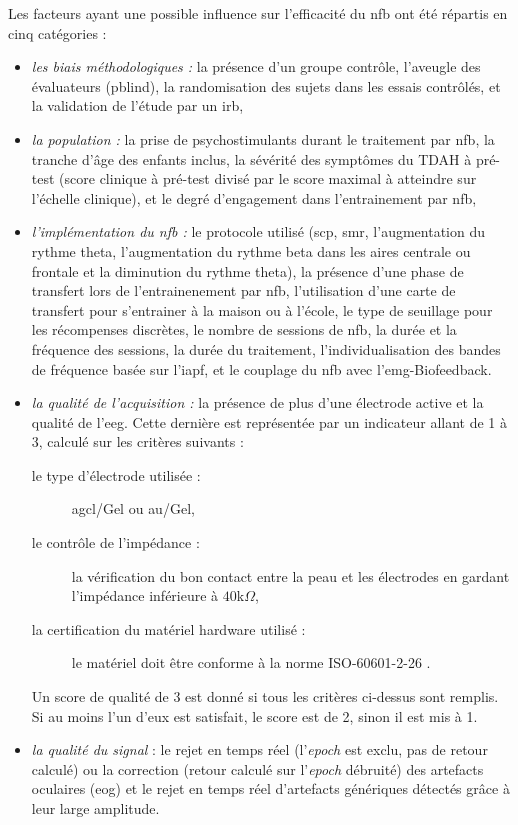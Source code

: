 Les facteurs ayant une possible influence sur l'efficacité du \gls{nfb} ont été répartis en cinq catégories :
\renewcommand{\labelitemi}{$\bullet$}
\begin{itemize}
\item \emph{les biais méthodologiques :} la présence d'un groupe contrôle, l'aveugle des évaluateurs (\gls{pblind}), la randomisation des sujets dans les essais contrôlés, et la validation de l'étude 
par un \gls{irb},
\item \emph{la population :} la prise de psychostimulants durant le traitement par \gls{nfb}, la tranche d'âge des enfants inclus, la sévérité des symptômes du TDAH à pré-test (score clinique à pré-test
divisé par le score maximal à atteindre sur l'échelle clinique), et le degré d'engagement dans l'entrainement par \gls{nfb},
\item \emph{l'implémentation du \gls{nfb} :} le protocole utilisé (\gls{scp}, \gls{smr}, l'augmentation du rythme theta, l'augmentation du rythme beta dans les aires centrale ou frontale 
et la diminution du rythme theta), la présence d'une phase de transfert lors de l'entrainenement par \gls{nfb}, l'utilisation d'une carte de transfert pour s'entrainer à la maison ou à l'école, 
le type de seuillage pour les récompenses discrètes, le nombre de sessions de \gls{nfb}, la durée et la fréquence des sessions, la durée du traitement, l'individualisation des bandes de fréquence
basée sur l'\gls{iapf}, et le couplage du \gls{nfb} avec l'\gls{emg}-Biofeedback.
\item \emph{la qualité de l'acquisition :} la présence de plus d'une électrode active et la qualité de l'\gls{eeg}. Cette dernière est représentée par un indicateur allant de 1 à 3, calculé sur les critères 
suivants : 
\begin{description} 
\item[le type d'électrode utilisée :] \gls{agcl}/Gel ou \gls{au}/Gel,
\item[le contrôle de l'impédance :] la vérification du bon contact entre la peau et les électrodes en gardant l'impédance inférieure à $40$k$\Omega$,
\item[la certification du matériel hardware utilisé :] le matériel doit être conforme à la norme ISO-60601-2-26 \citep{ISO}.
\end{description}

Un score de qualité de 3 est donné si tous les critères ci-dessus sont remplis. Si au moins l'un d'eux est satisfait, le score est de 2, sinon il est mis à 1.

\item \emph{la qualité du signal} : le rejet en temps réel (l'\textit{epoch} est exclu, pas de retour calculé) ou la correction (retour calculé sur l'\textit{epoch} débruité) des 
artefacts oculaires (\gls{eog}) et le rejet en temps réel d'artefacts génériques détectés grâce à leur large amplitude. 
\end{itemize}

